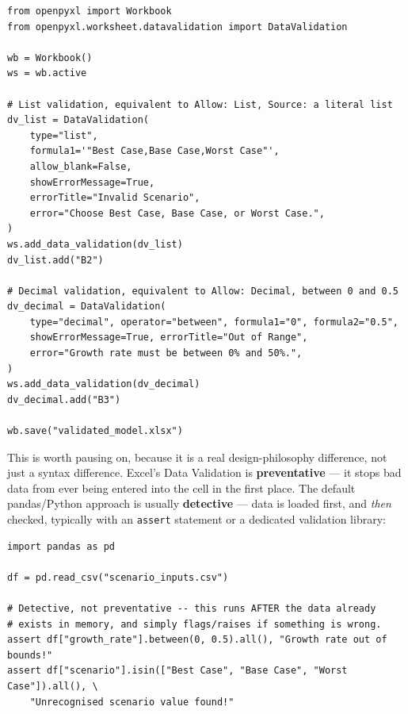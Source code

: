 \documentclass[11pt,a4paper]{article}
\begin{document}
\begin{lstlisting}[style=pythonstyle, caption={Data Validation, the openpyxl way -- rules written directly into the .xlsx so Excel itself enforces them on open}]
from openpyxl import Workbook
from openpyxl.worksheet.datavalidation import DataValidation

wb = Workbook()
ws = wb.active

# List validation, equivalent to Allow: List, Source: a literal list
dv_list = DataValidation(
    type="list",
    formula1='"Best Case,Base Case,Worst Case"',
    allow_blank=False,
    showErrorMessage=True,
    errorTitle="Invalid Scenario",
    error="Choose Best Case, Base Case, or Worst Case.",
)
ws.add_data_validation(dv_list)
dv_list.add("B2")

# Decimal validation, equivalent to Allow: Decimal, between 0 and 0.5
dv_decimal = DataValidation(
    type="decimal", operator="between", formula1="0", formula2="0.5",
    showErrorMessage=True, errorTitle="Out of Range",
    error="Growth rate must be between 0% and 50%.",
)
ws.add_data_validation(dv_decimal)
dv_decimal.add("B3")

wb.save("validated_model.xlsx")
\end{lstlisting}

\begin{keyconcept}
This is worth pausing on, because it is a real design-philosophy difference, not just a syntax difference. Excel's Data Validation is \textbf{preventative} --- it stops bad data from ever being entered into the cell in the first place. The default pandas/Python approach is usually \textbf{detective} --- data is loaded first, and \emph{then} checked, typically with an \texttt{assert} statement or a dedicated validation library:
\end{keyconcept}

\begin{lstlisting}[style=pythonstyle, caption={The pandas-native approach: validate after loading, not while typing}]
import pandas as pd

df = pd.read_csv("scenario_inputs.csv")

# Detective, not preventative -- this runs AFTER the data already
# exists in memory, and simply flags/raises if something is wrong.
assert df["growth_rate"].between(0, 0.5).all(), "Growth rate out of bounds!"
assert df["scenario"].isin(["Best Case", "Base Case", "Worst Case"]).all(), \
    "Unrecognised scenario value found!"
\end{lstlisting}
\end{document}
